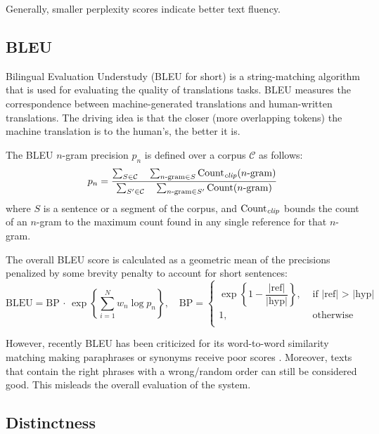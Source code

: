 Generally, smaller perplexity scores indicate better text fluency.



\subsection{BLEU}
\label{sec:bleu}

Bilingual Evaluation Understudy (BLEU for short) \citep{papineni2002bleu} is a string-matching algorithm that is used for evaluating the quality of translations tasks. BLEU measures the correspondence between machine-generated translations and human-written translations.%
The driving idea is that the closer (more overlapping tokens) the machine translation is to the human's, the better it is.

The BLEU $n$-gram precision $p_n$ is defined over a corpus $\mathcal{C}$ as follows:
\[ p_n = \dfrac
{\sum_{S \in \mathcal{C}} \quad \sum_{n\text{-gram} \in S} \text{Count}_\text{\textit{clip}}(n\text{-gram})}
{\sum_{S' \in \mathcal{C}} \quad \sum_{n\text{-gram} \in S'} \text{Count}(n\text{-gram})} 
\]
where $S$ is a sentence or a segment of the corpus, and $\text{Count}_\text{\textit{clip}}$ bounds the count of an $n$-gram to the maximum count found in any single reference for that $n$-gram.

The overall BLEU score is calculated as a geometric mean of the precisions penalized by some brevity penalty to account for short sentences:
\[ \text{BLEU} = \text{BP} \,\cdot\, \exp\left\{ \sum_{i=1}^{N} w_n \log p_n \right\}, \quad 
\text{BP} =  \begin{cases}
	\exp\left\{ 1 - \dfrac{|\text{ref}|} { |\text{hyp}| }\right\}, & \text{ if |ref| > |hyp| } \\
	1, & \text{ otherwise } \\
\end{cases}
\]

However, recently BLEU has been criticized for its word-to-word similarity matching making paraphrases or synonyms receive poor scores \citep{callison2006re, cifka2018bleu, mathur2020tangled}. Moreover, texts that contain the right phrases with a wrong/random order can still be considered good. This misleads the overall evaluation of the system. %


\subsection{Distinctness}
\label{sec:diversity}

